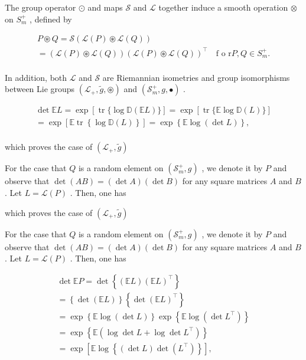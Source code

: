 \documentclass[11pt]{article}
\begin{document}
The group operator  $\odot$  and maps  $\mathcal{S}$  and  $\mathcal{L}$  together induce a smooth operation  $\otimes$  on  $S_{m}^{+}$ , defined by

$$
\begin{array}{l} P \circledast Q = \mathcal {S} (\mathcal {L} (P) \circledast \mathcal {L} (Q)) \\ = \left(\mathcal {L} (P) \circledast \mathcal {L} (Q)\right) \left(\mathcal {L} (P) \circledast \mathcal {L} (Q)\right) ^ {\top} \quad \text {f o r} P, Q \in S _ {m} ^ {+}. \\ \end{array}
$$

In addition, both  $\mathcal{L}$  and  $\mathcal{S}$  are Riemannian isometries and group isomorphisms between Lie groups  $(\mathcal{L}_{+},\tilde{g},\circledast)$  and  $(\mathcal{S}_m^+,g,\bullet)$ .

$$
\begin{array}{l} \det  \mathbb {E} L = \exp [ \operatorname {t r} \{\log \mathbb {D} (\mathbb {E} L) \} ] = \exp [ \operatorname {t r} \{\mathbb {E} \log \mathbb {D} (L) \} ] \\ = \exp \left[ \mathbb {E} \operatorname {t r} \left\{\log \mathbb {D} (L) \right\} \right] = \exp \left\{\mathbb {E} \log (\det  L) \right\}, \\ \end{array}
$$

which proves the case of  $(\mathcal{L}_{+},\tilde{g})$

For the case that  $Q$  is a random element on  $(\mathcal{S}_m^+, g)$ , we denote it by  $P$  and observe that  $\operatorname{det}(AB) = (\operatorname{det} A)(\operatorname{det} B)$  for any square matrices  $A$  and  $B$ . Let  $L = \mathcal{L}(P)$ . Then, one has

which proves the case of  $(\mathcal{L}_{+},\tilde{g})$

For the case that  $Q$  is a random element on  $(\mathcal{S}_m^+, g)$ , we denote it by  $P$  and observe that  $\operatorname{det}(AB) = (\operatorname{det} A)(\operatorname{det} B)$  for any square matrices  $A$  and  $B$ . Let  $L = \mathcal{L}(P)$ . Then, one has

$$
\begin{array}{l} \det  \mathbb {E} P = \det  \left\{\left(\mathbb {E} L\right) \left(\mathbb {E} L\right) ^ {\top} \right\} \\ = \left\{\det  (\mathbb {E} L) \right\} \left\{\det  (\mathbb {E} L) ^ {\top} \right\} \\ = \exp \left\{\mathbb {E} \log (\det  L) \right\} \exp \left\{\mathbb {E} \log (\det  L ^ {\top}) \right\} \\ = \exp \left\{\mathbb {E} \left(\log \det  L + \log \det  L ^ {\top}\right) \right\} \\ = \exp \left[ \mathbb {E} \log \left\{\left(\det  L\right) \det  \left(L ^ {\top}\right) \right\} \right], \\ \end{array}
$$
\end{document}
